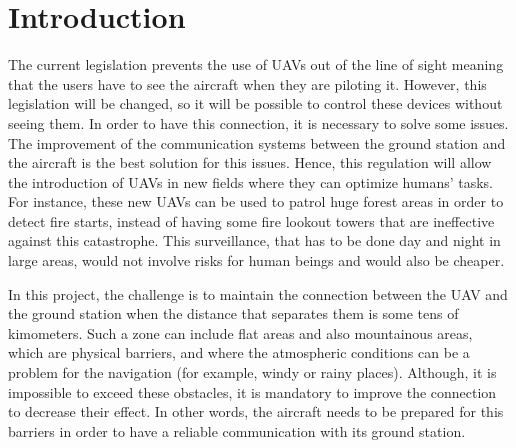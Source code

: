 \chapter{Introduction}\label{ch:intro}

The current legislation prevents the use of UAVs out of the line of sight meaning that the users have to see the aircraft when they are piloting it. However, this legislation will be changed, so it will be possible to control these devices without seeing them. In order to have this connection, it is necessary to solve some issues. The improvement of the communication systems between the ground station and the aircraft is the best solution for this issues. Hence, this regulation will allow the introduction of UAVs in new fields where they can optimize humans' tasks. For instance, these new UAVs can be used to patrol huge forest areas in order to detect fire starts, instead of having some fire lookout towers that are ineffective against this catastrophe. This surveillance, that has to be done day and night in large areas, would not involve risks for human beings and would also be cheaper. 




In this project, the challenge is to maintain the connection between the UAV and the ground station when the distance that separates them is some tens of kimometers. Such a zone can include flat areas and also mountainous areas, which are physical barriers, and where the atmospheric conditions can be a problem for the navigation (for example, windy or rainy places). Although, it is impossible to exceed these obstacles, it is mandatory to improve the connection to decrease their effect. In other words, the aircraft needs to be prepared for this barriers in order to have a reliable communication with its ground station. 

